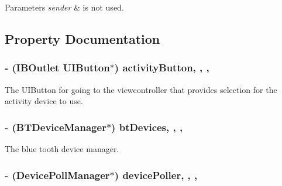 \begin{DoxyParams}{Parameters}
{\em sender} & is not used. \\
\hline
\end{DoxyParams}


\subsection{Property Documentation}
\hypertarget{interface_home_screen_v_c_aaf7bc9fa4c07923d2df10b9dc6977c02}{
\subsubsection[{activity\-Button}]{\setlength{\rightskip}{0pt plus 5cm}-\/ (I\-B\-Outlet U\-I\-Button$\ast$) activity\-Button\hspace{0.3cm}{\ttfamily [read]}, {\ttfamily [write]}, {\ttfamily [nonatomic]}, {\ttfamily [retain]}}}\label{interface_home_screen_v_c_aaf7bc9fa4c07923d2df10b9dc6977c02}
The U\-I\-Button for going to the viewcontroller that provides selection for the activity device to use. \hypertarget{interface_home_screen_v_c_a2d29b010a455bf37937421fac3bfde81}{
\subsubsection[{bt\-Devices}]{\setlength{\rightskip}{0pt plus 5cm}-\/ ({\bf B\-T\-Device\-Manager}$\ast$) bt\-Devices\hspace{0.3cm}{\ttfamily [read]}, {\ttfamily [write]}, {\ttfamily [atomic]}, {\ttfamily [retain]}}}\label{interface_home_screen_v_c_a2d29b010a455bf37937421fac3bfde81}
The blue tooth device manager. \hypertarget{interface_home_screen_v_c_a2a965b7384a780e031c9cb85d18aeeb1}{
\subsubsection[{device\-Poller}]{\setlength{\rightskip}{0pt plus 5cm}-\/ ({\bf Device\-Poll\-Manager}$\ast$) device\-Poller\hspace{0.3cm}{\ttfamily [read]}, {\ttfamily [write]}, {\ttfamily [atomic]}, {\ttfamily [retain]}}}\label{interface_home_screen_v_c_a2a965b7384a780e031c9cb85d18aeeb1}
